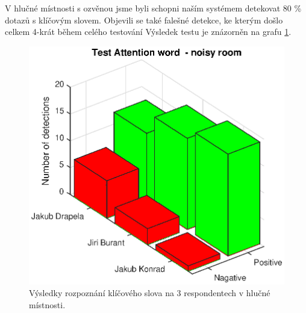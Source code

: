 \documentclass[12pt,a4paper]{article}
\begin{document}
V hlučné místnosti s ozvěnou jsme byli schopni naším systémem detekovat 80 \% dotazů s klíčovým slovem. Objevili se také falešné detekce, ke kterým došlo celkem 4-krát během celého testování Výsledek testu je znázorněn na grafu \ref*{fig:AttentionWord2}. 

	\begin{figure}[ht]
		
		\centering
		\includegraphics[width = 12cm]{AtWr_test2.eps}
		\caption{Výsledky rozpoznání klíčového slova na 3 respondentech v hlučné místnosti.}
		\label{fig:AttentionWord2}
	\end{figure}
\end{document}
